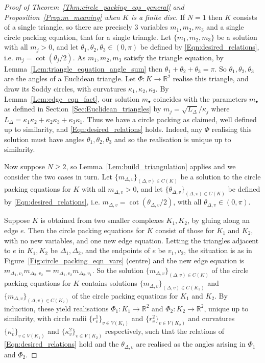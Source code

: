 \documentclass[12pt]{amsart}
\numberwithin{equation}{section}
\theoremstyle{named}
\newcommand{\refsec}[1]{Section~\ref{Sec:#1}}
\newcommand{\reffig}[1]{Figure~\ref{Fig:#1}}
\newcommand{\refeqn}[1]{\eqref{Eqn:#1}}
\newcommand{\reflem}[1]{Lemma~\ref{Lem:#1}}
\newcommand{\refprop}[1]{Proposition~\ref{Prop:#1}}
\newcommand{\refthm}[1]{Theorem~\ref{Thm:#1}}
\newcommand{\R}{\mathbb{R}}
\newcommand{\To}{\longrightarrow}
\begin{document}
\begin{proof}[Proof of \refthm{circle_packing_eqs_general} and \refprop{m_meaning} when $K$ is a finite disc]
If $N=1$ then $K$ consists of a single triangle, so there are precisely $3$ variables $m_1, m_2, m_3$ and a single circle packing equation, that for a single triangle. Let $\{m_1, m_2, m_3\}$ be a solution with all $m_j > 0$, and let $\theta_1, \theta_2, \theta_3 \in (0, \pi)$ be defined by \refeqn{desired_relations}, i.e. $m_j = \cot(\theta_j/2)$. As $m_1, m_2, m_3$ satisfy the triangle equation, by \reflem{triangle_equation_angle_sum} then $\theta_1 + \theta_2 + \theta_3 = \pi$. So $\theta_1, \theta_2, \theta_3$ are the angles of a Euclidean triangle. Let $\Phi \colon K \To \R^2$ realise this triangle, and draw its Soddy circles, with curvatures $\kappa_1, \kappa_2, \kappa_3$. By \reflem{edge_eqn_fact}, our solution $m_\bullet$ coincides with the parameters $m_\bullet$ as defined in \refsec{Euclidean_triangles} by $m_j = \sqrt{L_\Delta}/{\kappa_j}$ where $L_\Delta = \kappa_1 \kappa_2 + \kappa_2 \kappa_3 + \kappa_3 \kappa_1$. Thus we have a circle packing as claimed, well defined up to similarity, and \refeqn{desired_relations} holds. Indeed, any $\Phi$ realising this solution must have angles $\theta_1, \theta_2, \theta_3$ and so the realisation is unique up to similarity.

Now suppose $N \geq 2$, so \reflem{build_triangulation} applies and we consider the two cases in turn. Let $\{m_{\Delta,v}\}_{(\Delta,v) \in C(K)}$ be a solution to the circle packing equations for $K$ with all $m_{\Delta,v}>0$, and let $\{\theta_{\Delta,v}\}_{(\Delta,v) \in C(K)}$ be defined by \refeqn{desired_relations}, i.e. $m_{\Delta,v} = \cot(\theta_{\Delta,v}/2)$, with all $\theta_{\Delta,v} \in (0, \pi)$.

Suppose $K$ is obtained from two smaller complexes $K_1, K_2$, by gluing along an edge $e$. Then the circle packing equations for $K$ consist of those for $K_1$ and $K_2$, with no new variables, and one new edge equation. Letting the triangles adjacent to $e$ in $K_1, K_2$ be $\Delta_1, \Delta_2$, and the endpoints of $e$ be $v_1, v_2$, the situation is as in \reffig{circle_packing_eqn_vars} (centre) and the new edge equation is $m_{\Delta_1,v_1} m_{\Delta_2,v_2} = m_{\Delta_1,v_2} m_{\Delta_2,v_1}$. So the solution $\{m_{\Delta,v}\}_{(\Delta, v) \in C(K)}$ of the circle packing equations for $K$ contains solutions $\{m_{\Delta,v}\}_{(\Delta,v) \in C(K_1)}$ and $\{m_{\Delta,v}\}_{(\Delta,v) \in C(K_2)}$ of the circle packing equations for $K_1$ and $K_2$. By induction, these yield realisations $\Phi_1 \colon K_1 \To \R^2$ and $\Phi_2 \colon K_2 \To \R^2$, unique up to similarity, with circle radii $\{r_v^1\}_{v \in V(K_1)}$ and $\{r_v^2\}_{v \in V(K_2)}$ and curvatures $\{\kappa_v^1\}_{v \in V(K_1)}$ and $\{\kappa_v^2\}_{v \in V(K_2)}$ respectively, such that the relations of \refeqn{desired_relations} hold and the $\theta_{\Delta,v}$ are realised as the angles arising in $\Phi_1$ and $\Phi_2$.


\end{proof}
\end{document}
